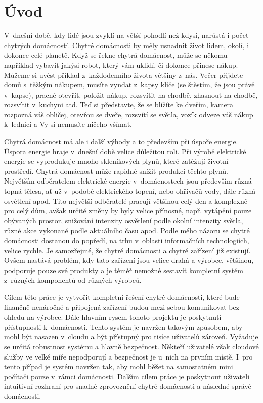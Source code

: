 \chapter{Úvod}

V~dnešní době, kdy lidé jsou zvyklí na větší pohodlí než kdysi, narůstá i počet chytrých domácností.
Chytré domácnosti by měly usnadnit život lidem, okolí, i dokonce celé planetě.
Když se řekne chytrá domácnost, může se někomu například vybavit jakýsi robot, který vám uklidí, či dokonce přinese nákup.
Můžeme si uvést příklad z~každodenního života většiny z~nás.
Večer přijdete domů s~těžkým nákupem, musíte vyndat z~kapsy klíče (se štěstím, že jsou právě v~kapse), pracně otevřít, položit nákup, rozsvítit na chodbě, zhasnout na chodbě,
rozsvítit v~kuchyni atd.
Teď si představte, že se blížíte ke dveřím, kamera rozpozná váš obličej, otevřou se dveře, rozsvítí se světla, vozík odveze váš nákup k~lednici a Vy si nemusíte ničeho všímat.

Chytrá domácnost má ale i další výhody a to především při úspoře energie.
Úspora energie hraje v~dnešní době velice důležitou roli.
Při výrobě elektrické energie se vyprodukuje mnoho skleníkových plynů, které zatěžují životní prostředí.
Chytrá domácnost může rapidně snížit produkci těchto plynů.
Největším odběratelem elektrické energie v~domácnostech jsou především různá topná tělesa, ať už v~podobě elektrického topení, nebo ohřívačů vody, dále různá osvětlení apod.
Tito největší odběratelé pracují většinou celý den a komplexně pro celý dům, avšak určité změny by byly velice přínosné, např. vytápění pouze obývaných prostor,
snižování intenzity osvětlení podle okolní intenzity světla, různé akce vykonané podle aktuálního času apod.
Podle mého názoru se chytré domácnosti dostanou do popředí, na trhu v~oblasti informačních technologiích, velice rychle.
Je samozřejmé, že chytré domácnosti a chytré zařízení již existují.
Ovšem nastává problém, kdy tato zařízení jsou velice drahá a výrobce, většinou, podporuje pouze své produkty a je téměř nemožné sestavit kompletní systém z~různých komponentů od různých výrobců.

Cílem této práce je vytvořit kompletní řešení chytré domácnosti, které bude finančně nenáročné a připojená zařízení budou mezi sebou komunikovat bez ohledu na výrobce.
Dále hlavním rysem tohoto projektu je poskytnutí přístupnosti k~domácnosti.
Tento systém je navržen takovým způsobem, aby mohl být nasazen v~cloudu a být přístupný pro tisíce uživatelů zároveň.
Vyžaduje se určitá robustnost systému a hlavně bezpečnost.
Někteří uživatelé však cloudové služby ve velké míře nepodporují a bezpečnost je u~nich na prvním místě.
I~pro tento případ je systém navržen tak, aby mohl běžet na samostatném mini počítači pouze v~rámci domácnosti.
Dalším cílem práce je poskytnout uživateli intuitivní rozhraní pro snadné zprovoznění chytré domácnosti a následné správě domácnosti.

